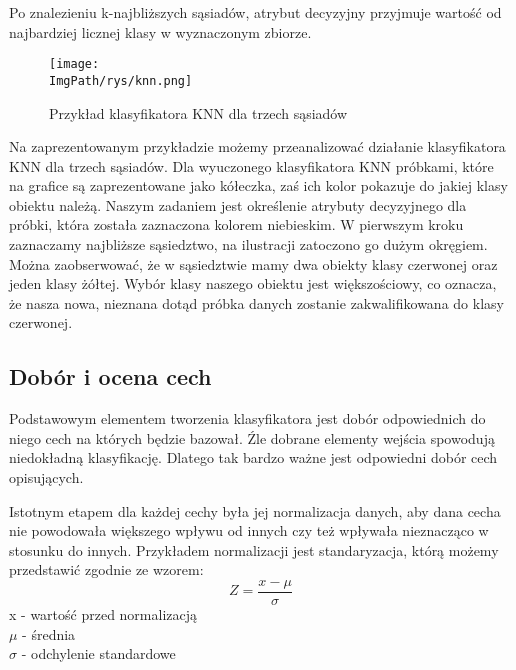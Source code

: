 \documentclass[a4paper,12pt,twoside,openany]{report}
\newcommand{\ImgPath}{.}
\begin{document}
Po znalezieniu k-najbliższych sąsiadów, atrybut decyzyjny przyjmuje wartość od najbardziej licznej klasy w wyznaczonym zbiorze.

\begin{figure}[H]	
	\centering
	\texttt{[image: \\ImgPath/rys/knn.png]}
	
	\caption{Przykład klasyfikatora KNN dla trzech sąsiadów}
\end{figure}

Na zaprezentowanym przykładzie możemy przeanalizować działanie klasyfikatora KNN dla trzech sąsiadów. Dla wyuczonego klasyfikatora KNN próbkami, które na grafice są zaprezentowane jako kółeczka, zaś ich kolor pokazuje do jakiej klasy obiektu należą. Naszym zadaniem jest określenie atrybuty decyzyjnego dla próbki, która została zaznaczona kolorem niebieskim. W pierwszym kroku zaznaczamy najbliższe sąsiedztwo, na ilustracji zatoczono go dużym okręgiem. Można zaobserwować, że w sąsiedztwie mamy dwa obiekty klasy czerwonej oraz jeden klasy żółtej. Wybór klasy naszego obiektu jest większościowy, co oznacza, że nasza nowa, nieznana dotąd próbka danych zostanie zakwalifikowana do klasy czerwonej.


\subsection{Dobór i ocena cech}
Podstawowym elementem tworzenia klasyfikatora jest dobór odpowiednich do niego cech na których będzie bazował. Źle dobrane elementy wejścia spowodują niedokładną klasyfikację. Dlatego tak bardzo ważne jest odpowiedni dobór cech opisujących.

Istotnym etapem dla każdej cechy była jej normalizacja danych, aby dana cecha nie powodowała większego wpływu od innych czy też wpływała nieznacząco w stosunku do innych. Przykładem normalizacji jest standaryzacja, którą możemy przedstawić zgodnie ze wzorem: 
\begin{equation}
	  Z = \dfrac{x - \mu}{\sigma} 
\end{equation}
x - wartość przed normalizacją \\ $\mu$ - średnia \\ $\sigma$ - odchylenie standardowe
\end{document}
